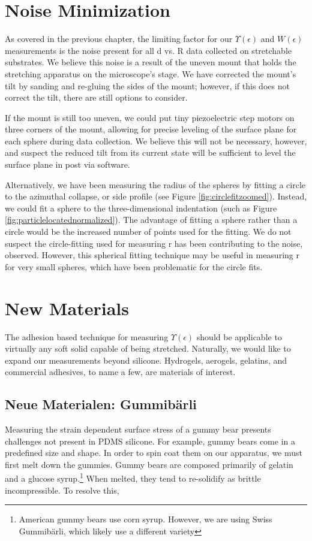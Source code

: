\section{Noise Minimization}
As covered in the previous chapter, the limiting factor for our $ \Upsilon(\epsilon) $ and $ W(\epsilon) $ measurements is the noise present for all d vs. R data collected on stretchable substrates. We believe this noise is a result of the uneven mount that holds the stretching apparatus on the microscope's stage. We have corrected the mount's tilt by sanding and re-gluing the sides of the mount; however, if this does not correct the tilt, there are still options to consider. 

If the mount is still too uneven, we could put tiny piezoelectric step motors on three corners of the mount, allowing for precise leveling of the surface plane for each sphere during data collection. We believe this will not be necessary, however, and suspect the reduced tilt from its current state will be sufficient to level the surface plane in post via software.

Alternatively, we have been measuring the radius of the spheres by fitting a circle to the azimuthal collapse, or side profile (see Figure \ref{fig:circlefitzoomed}). Instead, we could fit a sphere to the three-dimensional indentation (such as Figure \ref{fig:particlelocatednormalized}). The advantage of fitting a sphere rather than a circle would be the increased number of points used for the fitting. We do not suspect the circle-fitting used for measuring r has been contributing to the noise, observed. However, this spherical fitting technique may be useful in measuring r for very small spheres, which have been problematic for the circle fits.    


\section{New Materials}
The adhesion based technique for measuring $\Upsilon(\epsilon)$ should be applicable to virtually any soft solid capable of being stretched. Naturally, we would like to expand our measurements beyond silicone. Hydrogels, aerogels, gelatins, and commercial adhesives, to name a few, are materials of interest. 
\subsection{Neue Materialen: Gummibärli}
Measuring the strain dependent surface stress of a gummy bear presents challenges not present in PDMS silicone. For example, gummy bears come in a predefined size and shape. In order to spin coat them on our apparatus, we must first melt down the gummies. Gummy bears are composed primarily of gelatin and a glucose syrup.\footnote{American gummy bears use corn syrup. However, we are using Swiss  Gummibärli, which likely use a different variety}  When melted, they tend to re-solidify as brittle incompressible. To resolve this, 
  
